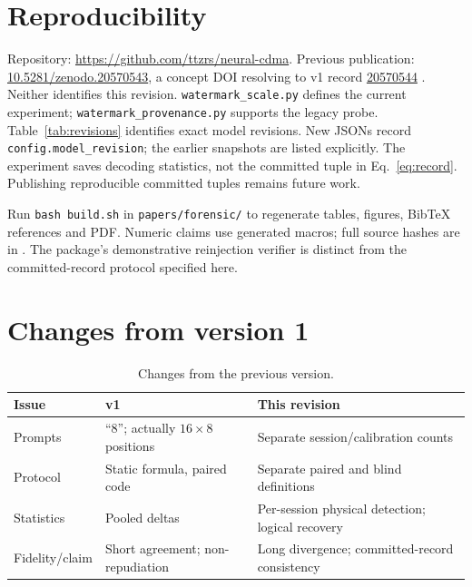 \documentclass[11pt]{article}
\begin{document}
\section*{Reproducibility}
Repository: \url{https://github.com/ttzrs/neural-cdma}. Previous publication:
\href{https://doi.org/10.5281/zenodo.20570543}{10.5281/zenodo.20570543}, a concept DOI
resolving to v1 record \href{https://doi.org/10.5281/zenodo.20570544}{20570544}
\citep{vargasv1}. Neither identifies this revision.
\texttt{watermark\_scale.py} defines the current experiment;
\texttt{watermark\_provenance.py} supports the legacy probe.
Table~\ref{tab:revisions} identifies exact model revisions. New JSONs record
\texttt{config.model\_revision}; the earlier snapshots are listed explicitly.
The experiment saves decoding statistics, not the committed tuple in
Eq.~\eqref{eq:record}. Publishing reproducible committed tuples remains future work.

Run \texttt{bash build.sh} in \texttt{papers/forensic/} to regenerate tables,
figures, BibTeX references and PDF. Numeric claims use generated macros; full
source hashes are in . The package's demonstrative
reinjection verifier is distinct from the committed-record protocol specified here.

\begingroup\small


\endgroup
\appendix
\section{Changes from version 1}
\begin{table}[htbp]\centering\small
\begin{tabular}{p{.17\linewidth}p{.32\linewidth}p{.40\linewidth}}
\toprule
Issue & v1 & This revision\\
\midrule
Prompts & ``8''; actually $16\times8$ positions & Separate session/calibration counts\\
Protocol & Static formula, paired code & Separate paired and blind definitions\\
Statistics & Pooled deltas & Per-session physical detection; logical recovery\\
Fidelity/claim & Short agreement; non-repudiation & Long divergence; committed-record consistency\\
\bottomrule
\end{tabular}
\caption{Changes from the previous version.}\label{tab:corrections}
\end{table}
\end{document}

